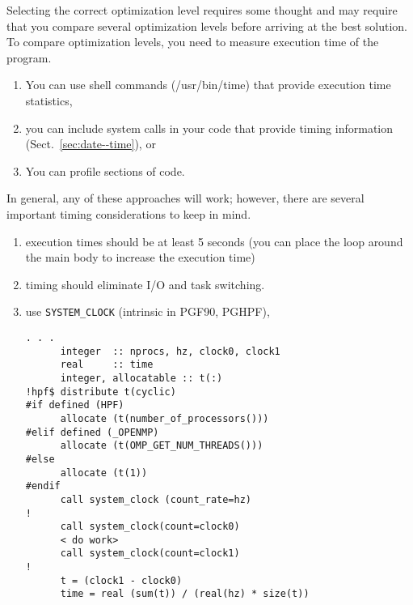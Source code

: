 Selecting the correct optimization level requires some thought and may
require that you compare several optimization levels before arriving
at the best solution. To compare optimization levels, you need to
measure execution time of the program. 

\begin{enumerate}
\item You can use shell commands (/usr/bin/time) that provide
  execution time statistics,
\item you can include system calls in your code that provide timing
  information (Sect.~\ref{sec:date--time}), or
\item You can profile sections of code. 
\end{enumerate}
In general, any of these approaches will work; however, there are
several important timing considerations to keep in mind. 
\begin{enumerate}
\item execution times should be at least 5 seconds (you can place the
  loop around the main body to increase the execution time)
\item timing should eliminate I/O and task switching.
\item use \verb.SYSTEM_CLOCK. (intrinsic in PGF90, PGHPF), 
\begin{verbatim}
. . .
      integer  :: nprocs, hz, clock0, clock1
      real     :: time
      integer, allocatable :: t(:)
!hpf$ distribute t(cyclic)
#if defined (HPF)
      allocate (t(number_of_processors()))
#elif defined (_OPENMP)
      allocate (t(OMP_GET_NUM_THREADS()))
#else
      allocate (t(1))
#endif
      call system_clock (count_rate=hz)
!
      call system_clock(count=clock0)
      < do work>
      call system_clock(count=clock1)
!
      t = (clock1 - clock0)
      time = real (sum(t)) / (real(hz) * size(t))
\end{verbatim}
\end{enumerate}





